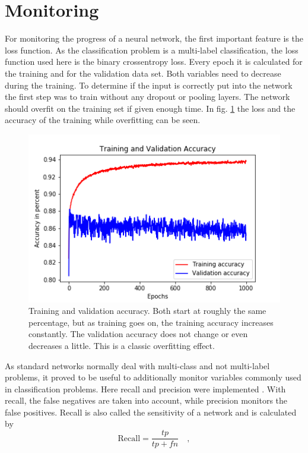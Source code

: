 \section{Monitoring}
For monitoring the progress of a neural network, the first important feature is the loss function. As the classification problem is a multi-label classification, the loss function used here is the binary crossentropy loss. Every epoch it is calculated for the training and for the validation data set. Both variables need to decrease during the training. To determine if the input is correctly put into the network the first step was to train without any dropout or pooling layers. The network should overfit on the training set if given enough time. In fig. \ref{overfitacc} the loss and the accuracy of the training while overfitting can be seen.
\begin{figure}
\centering
\includegraphics[scale=0.8]{trainvalacc.png}
\caption{Training and validation accuracy. Both start at roughly the same percentage, but as training goes on, the training accuracy increases constantly. The validation accuracy does not change or even decreases a little. This is a classic overfitting effect.}
\label{overfitacc}
\end{figure}
As standard networks normally deal with multi-class and not multi-label problems, it proved to be useful to additionally monitor variables commonly used in classification problems. Here recall and precision were implemented \cite{rijsbergen}. With recall, the false negatives are taken into account, while precision monitors the false positives. Recall is also called the sensitivity of a network and is calculated by
\begin{equation}
\mathrm{Recall} = \frac{tp}{tp + fn} \quad ,
\label{recall}
\end{equation}
